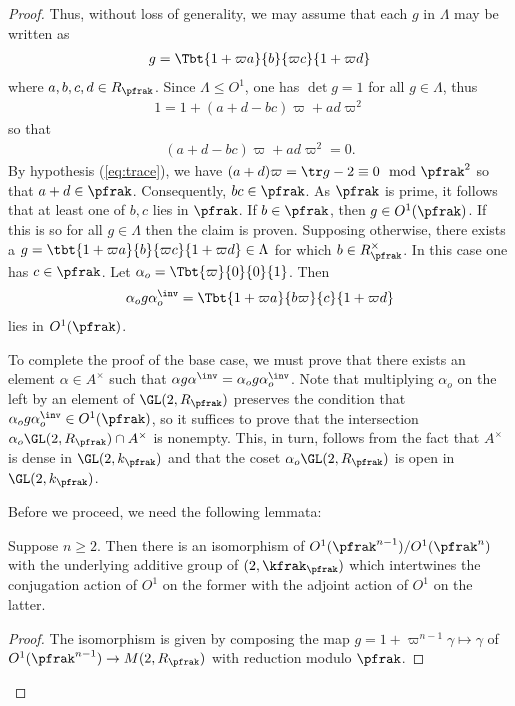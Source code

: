 \begin{proof}
    Thus, without loss of generality, we may assume that each $g$ in $\Lambda$ may be written as
    \begin{align*}
        g = \Tbt{1+\varpi a}{b}{\varpi c}{1+\varpi d}
    \end{align*}
    where $a,b,c,d \in R_\pfrak$.
    Since $\Lambda \leq O^1$, one has $\det g = 1 $ for all $g\in \Lambda$, thus
    \begin{align*}
        1 = 1 + (a+d - bc) \varpi + ad \varpi^2
    \end{align*}
    so that
    \begin{align}\label{eq:MandarinLeyden}
        (a+d - bc) \varpi + ad \varpi^2 =0.
    \end{align}
    By hypothesis (\ref{eq:trace}), we have $(a+d)\varpi = \tr g -2 \equiv 0 \mod \pfrak^2$ so that $a+d \in \pfrak$. Consequently, $bc \in \pfrak$. As $\pfrak$ is prime, it follows that at least one of $b,c$ lies in $\pfrak$. If $b \in \pfrak$, then $g \in O^1(\pfrak)$. If this is so for all $g \in \Lambda$ then the claim is proven. Supposing otherwise, there exists a $g=\tbt{1+\varpi a}{b}{\varpi c}{1+\varpi d} \in \Lambda$ for which $b \in R_\pfrak^\times$. In this case one has $c \in \pfrak$. Let $\alpha_o = \Tbt{\varpi}{0}{0}{1}$. Then
    \begin{align*}
        \alpha_o g\alpha_o^\inv  = \Tbt{1+\varpi a}{b\varpi}{c}{1+\varpi d}
    \end{align*}
    lies in $O^1(\pfrak)$.

    To complete the proof of the base case, we must prove that there exists an element $\alpha \in A^\times $ such that $\alpha g \alpha^\inv =  \alpha_o g \alpha_o^\inv$. Note that multiplying $\alpha_o$ on the left by an element of $\GL(2,R_\pfrak)$ preserves the condition that $\alpha_o g \alpha_o^\inv \in O^1(\pfrak)$, so it suffices to prove that the intersection $\alpha_o \GL(2,R_\pfrak) \cap A^\times $ is nonempty. This, in turn, follows from the fact that $A^\times$ is dense in $\GL(2,k_\pfrak)$ and that the coset  $\alpha_o \GL(2,R_\pfrak)$ is open in $\GL(2,k_\pfrak)$.

    Before we proceed, we need the following lemmata:
    \begin{lemma}\label{lemma:iso}
        Suppose $n\geq 2$. Then there is an isomorphism of $O^1(\pfrak^{n-1}) / O^1(\pfrak^{n})$ with the underlying additive group of $\sl(2,\kfrak_\pfrak)$ which intertwines the conjugation action of $O^1$ on the former with the adjoint action of $O^1$ on the latter.
    \end{lemma}
    \begin{proof}
        The isomorphism is given by composing the map $g = 1 + \varpi^{n-1}\gamma \mapsto \gamma$  of $O^1(\pfrak^{n-1}) \to M(2,R_\pfrak)$ with reduction modulo $\pfrak$.
    \end{proof}


\end{proof}
